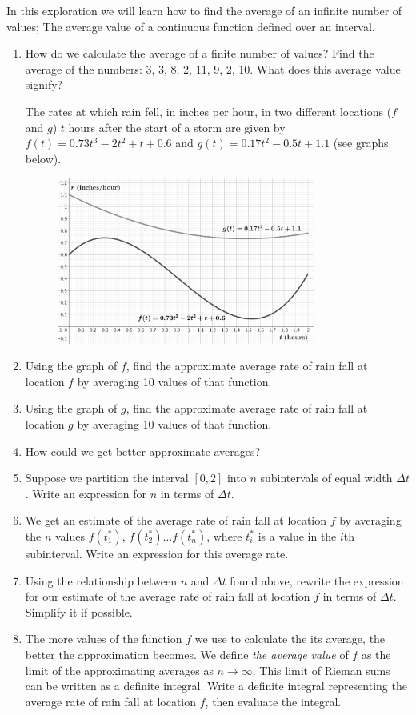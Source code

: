 \documentclass[12pt,letterpaper,fleqn]{article}
\begin{document}
In this exploration we will learn how to find the average of an infinite number of values; The average value of a continuous function defined over an interval.
\begin{enumerate}
\item How do we calculate the average of a finite number of values? Find the average of the numbers: 3, 3, 8, 2, 11, 9, 2, 10. What does this average value signify?

The rates at which rain fell, in inches per hour, in two different locations ($f$ and $g$) $t$ hours after the start of a storm are given by $f(t) = 0.73t^3 - 2t^2 + t + 0.6$ and $g(t) = 0.17t^2 - 0.5t + 1.1$ (see graphs below).
\begin{figure}[!htb]
 \centering
 \includegraphics[width=0.8\textwidth]{img/rainfall_rates.png}
\end{figure}
\item Using the graph of $f$, find the approximate average rate of rain fall at location $f$ by averaging 10 values of that function.
\item Using the graph of $g$, find the approximate average rate of rain fall at location $g$ by averaging 10 values of that function.
\item How could we get better approximate averages?
\item Suppose we partition the interval $[0, 2]$ into $n$ subintervals of equal width $\Delta t$. Write an expression for $n$ in terms of $\Delta t$.
\item We get an estimate of the average rate of rain fall at location $f$ by averaging the $n$ values $f(t_1^*)$, $f(t_2^*)\ldots f(t_n^*)$, where $t_i^*$ is a value in the $i$th subinterval. Write an expression for this average rate.
\item Using the relationship between $n$ and $\Delta t$ found above, rewrite the expression for our estimate of the average rate of rain fall at location $f$ in terms of $\Delta t$. Simplify it if possible.
\item The more values of the function $f$ we use to calculate the its average, the better the approximation becomes. We define \emph{the average value} of $f$ as the limit of the approximating averages as $n\to\infty$. This limit of Rieman sums can be written as a definite integral. Write a definite integral representing the average rate of rain fall at location $f$, then evaluate the integral.
\end{enumerate}
\end{document}
